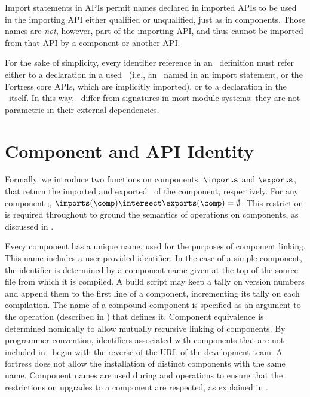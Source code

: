 Import statements in APIs permit names declared in imported APIs to be used
in the importing API either qualified or unqualified,
just as in components.  Those names are \emph{not}, however,
part of the importing API,
and thus cannot be imported from that API by a component or another API.

For the sake of simplicity, every identifier reference in an \apiN\
definition must refer either to a declaration in a used \apiN\
(i.e., an \apiN\ named in an import statement,
or the Fortress core APIs, which are implicitly imported),
or to a declaration in the \apiN\ itself.
In this way, \apisN\ differ from signatures in most module systems:
they are not parametric in their external dependencies.

\section{Component and API Identity}

Formally, we introduce two functions on components,
$\imports$ and $\exports$,
that return the imported and exported \apisN\ of the component, respectively.
For any component $\comp$, %
$\imports(\comp) \intersect \exports(\comp) = \emptyset$.
This restriction is required throughout to ground the semantics of
operations on components, as discussed in .

Every component
has a unique name, used for the purposes of component linking.
This name includes a user-provided identifier.
In the case of a simple component, the identifier is determined by
a component name given at
the top of the source file from which it is compiled.
A build script may keep a tally on version numbers and append them to the
first line of a component,
incrementing its tally on each compilation.
The name of a compound component is specified as an argument
to the \shellcommand{link} operation (described in )
that defines it.
Component equivalence is determined nominally
to allow mutually recursive linking of components.
By programmer convention, identifiers associated with components
that are not included in \library\
begin with the reverse of the URL of the development team.
A fortress does not allow the installation of
distinct components with the same name.
Component names are used during
\shellcommand{link} and \shellcommand{upgrade}
operations to ensure that the restrictions on
upgrades to a component are respected,
as explained in \secref{basicops}.

